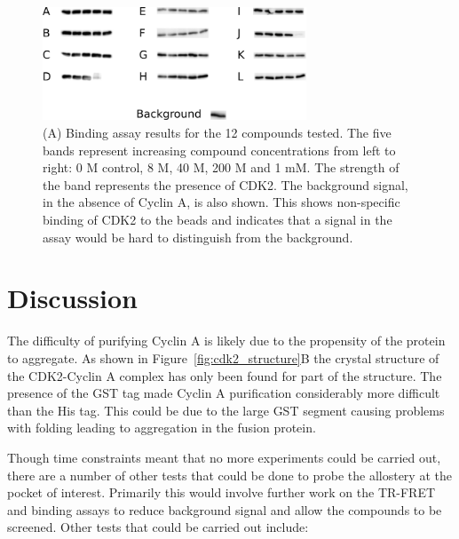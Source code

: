 \begin{figure}
\centering

\includegraphics[width=0.7\textwidth]{figures/binding_assay/binding_assay}

\caption[Results of binding assay with selected compounds]
{(A) Binding assay results for the 12 compounds tested.
The five bands represent increasing compound concentrations from left to right: 0 M control, 8 \textmu M, 40 \textmu M, 200 \textmu M and 1 mM.
The strength of the band represents the presence of CDK2.
The background signal, in the absence of Cyclin A, is also shown.
This shows non-specific binding of CDK2 to the beads and indicates that a signal in the assay would be hard to distinguish from the background.}

\label{fig:binding_assay}
\end{figure}


\section{Discussion}
\label{sec:cdk2_discussion}

The difficulty of purifying Cyclin A is likely due to the propensity of the protein to aggregate.
As shown in Figure~\ref{fig:cdk2_structure}B the crystal structure of the CDK2-Cyclin A complex has only been found for part of the structure.
The presence of the GST tag made Cyclin A purification considerably more difficult than the His tag.
This could be due to the large GST segment causing problems with folding leading to aggregation in the fusion protein.

Though time constraints meant that no more experiments could be carried out, there are a number of other tests that could be done to probe the allostery at the pocket of interest.
Primarily this would involve further work on the TR-FRET and binding assays to reduce background signal and allow the compounds to be screened.
Other tests that could be carried out include:

